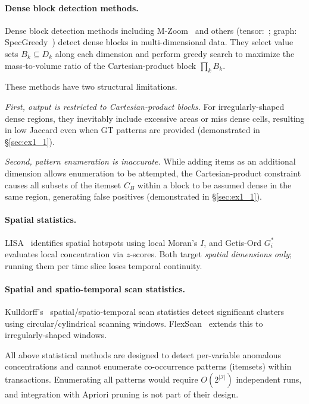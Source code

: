 \paragraph{Dense block detection methods.}
Dense block detection methods
including M-Zoom~\cite{shin2016mzoom}
and others (tensor:~\cite{jiang2015crossspot,shin2018mbiz,shin2017dcube,shin2017densealert,feng2020catchcore};
graph: SpecGreedy~\cite{feng2020specgreedy})
detect dense blocks in multi-dimensional data.
They select value sets $B_k \subseteq D_k$ along each dimension
and perform greedy search to maximize
the mass-to-volume ratio of the Cartesian-product block
$\prod_k B_k$.

These methods have two structural limitations.

\emph{First, output is restricted to Cartesian-product blocks.}
For irregularly-shaped dense regions,
they inevitably include excessive areas
or miss dense cells,
resulting in low Jaccard even when GT patterns are provided
(demonstrated in \S\ref{sec:ex1_1}).

\emph{Second, pattern enumeration is inaccurate.}
While adding items as an additional dimension
allows enumeration to be attempted,
the Cartesian-product constraint causes all subsets
of the itemset $C_B$ within a block
to be assumed dense in the same region,
generating false positives (demonstrated in \S\ref{sec:ex1_1}).

\paragraph{Spatial statistics.}
LISA~\cite{anselin1995lisa} identifies spatial hotspots
using local Moran's $I$, and
Getis-Ord $G_i^*$~\cite{ord1995getis} evaluates
local concentration via $z$-scores.
Both target \emph{spatial dimensions only};
running them per time slice
loses temporal continuity.

\paragraph{Spatial and spatio-temporal scan statistics.}
Kulldorff's~\cite{kulldorff1997spatial,kulldorff2001prospective}
spatial/spatio-temporal scan statistics detect
significant clusters using circular/cylindrical scanning windows.
FlexScan~\cite{tango2005flexscan} extends this
to irregularly-shaped windows.

All above statistical methods are designed
to detect per-variable anomalous concentrations
and cannot enumerate co-occurrence patterns (itemsets)
within transactions.
Enumerating all patterns would require
$O(2^{|\mathcal{I}|})$ independent runs,
and integration with Apriori pruning is not part of their design.


